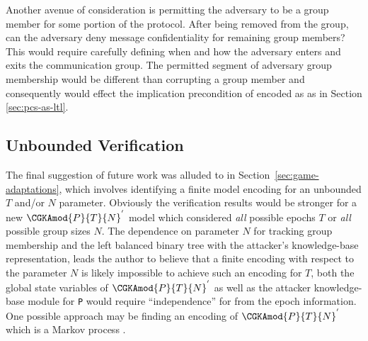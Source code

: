 Another avenue of consideration is permitting the adversary to be a group member for some portion of the \CGKAdef protocol.
After being removed from the group, can the adversary deny message confidentiality for remaining group members?
This would require carefully defining when and how the adversary enters and exits the communication group.
The permitted segment of adversary group membership would be different than corrupting a group member and consequently would effect the implication precondition of  encoded as  as in Section \ref{sec:pcs-as-ltl}.


\hypertarget{sec:unbounded-verification}{%
\subsection{Unbounded Verification}\label{sec:unbounded-verification}}

The final suggestion of future work was alluded to in Section\ \ref{sec:game-adaptations}, which involves identifying a finite model encoding for an unbounded \(T\) and/or \(N\) parameter.
Obviously the verification results would be stronger for a new \( \CGKAmod{P}{T}{N}^{'} \) model which considered \emph{all} possible epochs \(T\) or \emph{all} possible group sizes \(N\).
The dependence on parameter \(N\) for tracking group membership and the left balanced binary tree with the attacker's knowledge-base representation, leads the author to believe that a finite encoding with respect to the parameter \(N\) is likely impossible to achieve such an encoding for \(T\), both the global state variables of \( \CGKAmod{P}{T}{N}^{'} \) as well as the attacker knowledge-base module for \texttt{P} would require ``independence'' for from the epoch information.  
One possible approach may be finding an encoding of \( \CGKAmod{P}{T}{N}^{'} \) which is a Markov process \autocite{markov1906a}.
